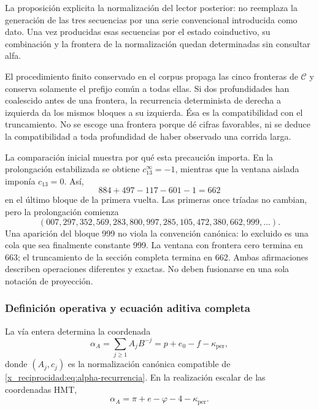 La proposición explicita la normalización del lector posterior: no
reemplaza la generación de las tres secuencias por una serie convencional
introducida como dato. Una vez producidas esas secuencias por el estado
coinductivo, su combinación y la frontera de la normalización quedan
determinadas sin consultar alfa.

El procedimiento finito conservado en el corpus propaga las cinco
fronteras de \(\mathcal C\) y conserva solamente el prefijo común a
todas ellas. Si dos profundidades han coalescido antes de una frontera,
la recurrencia determinista de derecha a izquierda da los mismos bloques
a su izquierda. Ésa es la compatibilidad con el truncamiento. No se
escoge una frontera porque dé cifras favorables, ni se deduce la
compatibilidad a toda profundidad de haber observado una corrida larga.

La comparación inicial muestra por qué esta precaución importa. En la
prolongación estabilizada se obtiene \(c_{13}^{\infty}=-1\), mientras
que la ventana aislada imponía \(c_{13}=0\). Así,
\[
 884+497-117-601-1=662
\]
en el último bloque de la primera vuelta. Las primeras once tríadas no
cambian, pero la prolongación comienza
\[
 (007,297,352,569,283,800,997,285,105,472,380,662,999,\ldots).
\]
Una aparición del bloque 999 no viola la convención canónica: lo
excluido es una cola que sea finalmente constante 999. La ventana con
frontera cero termina en 663; el truncamiento de la sección completa
termina en 662. Ambas afirmaciones describen operaciones diferentes y
exactas. No deben fusionarse en una sola notación de proyección.

\subsubsection{Definición operativa y ecuación aditiva completa}
\label{x_reciprocidad:subsec:alpha-definicion}

\begin{definition}
\label{x_reciprocidad:def:alpha-operativa}
La vía entera determina la coordenada
\begin{equation}
 \alpha_A=\sum_{j\geq1}A_jB^{-j}
 =p+e_0-f-\kappa_{\mathrm{per}},
 \label{x_reciprocidad:eq:alpha-via-a}
\end{equation}
donde \((A_j,c_j)\) es la normalización canónica compatible de
\eqref{x_reciprocidad:eq:alpha-recurrencia}. En la realización escalar de las
coordenadas HMT,
\begin{equation}
 \boxed{\alpha_A=
 \pi+e-\varphi
 -4-\kappa_{\mathrm{per}}.}
 \label{x_reciprocidad:eq:alpha-identidad-completa}
\end{equation}
\end{definition}

